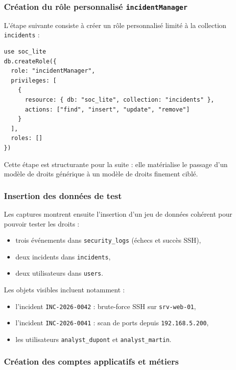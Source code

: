 \documentclass[11pt,a4paper]{article}
\begin{document}
\subsubsection{Création du rôle personnalisé \texttt{incidentManager}}

L'étape suivante consiste à créer un rôle personnalisé limité à la collection \texttt{incidents} :

\begin{tcolorbox}[breakable,colback=CodeBg,colframe=CodeFrame,title=Création du rôle personnalisé]
\begin{Verbatim}[fontsize=\small,breaklines,breakanywhere]
use soc_lite
db.createRole({
  role: "incidentManager",
  privileges: [
    {
      resource: { db: "soc_lite", collection: "incidents" },
      actions: ["find", "insert", "update", "remove"]
    }
  ],
  roles: []
})
\end{Verbatim}
\end{tcolorbox}

Cette étape est structurante pour la suite : elle matérialise le passage d'un modèle de droits générique à un modèle de droits finement ciblé.

\subsubsection{Insertion des données de test}

Les captures montrent ensuite l'insertion d'un jeu de données cohérent pour pouvoir tester les droits :
\begin{itemize}
  \item trois événements dans \texttt{security\_logs} (échecs et succès SSH),
  \item deux incidents dans \texttt{incidents},
  \item deux utilisateurs dans \texttt{users}.
\end{itemize}

Les objets visibles incluent notamment :
\begin{itemize}
  \item l'incident \texttt{INC-2026-0042} : brute-force SSH sur \texttt{srv-web-01},
  \item l'incident \texttt{INC-2026-0041} : scan de ports depuis \texttt{192.168.5.200},
  \item les utilisateurs \texttt{analyst\_dupont} et \texttt{analyst\_martin}.
\end{itemize}

\subsubsection{Création des comptes applicatifs et métiers}
\end{document}
